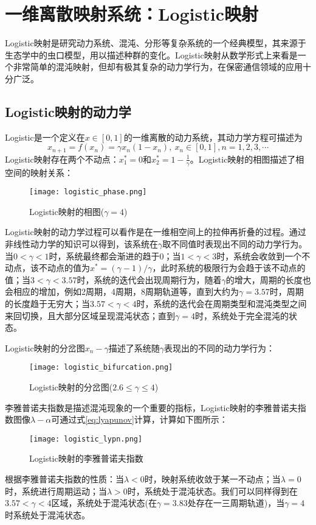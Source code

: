 \section{一维离散映射系统：Logistic映射}

Logistic映射是研究动力系统、混沌、分形等复杂系统的一个经典模型\cite{phatak1995logistic}，其来源于生态学中的虫口模型，用以描述种群的变化。Logistic映射从数学形式上来看是一个非常简单的混沌映射，但却有极其复杂的动力学行为，在保密通信领域的应用十分广泛。

\subsection{Logistic映射的动力学}

Logistic是一个定义在$x\in [0,1]$的一维离散的动力系统，其动力学方程可描述为
\begin{equation}
    x_{n+1}=f(x_n)=\gamma x_n(1-x_n),\ x_n\in [0,1], n=1,2,3,\cdots
\end{equation}
Logistic映射存在两个不动点：$x_1^*=0$和$x_2^*=1-\frac{1}{\gamma}$。Logistic映射的相图描述了相空间的映射关系：
\begin{figure}[!b]
	\centering
	\texttt{[image: logistic\_phase.png]}
    \caption{Logistic映射的相图($\gamma=4$)}
    \label{fig:logi_pha}
\end{figure}

Logistic映射的动力学过程可以看作是在一维相空间上的拉伸再折叠的过程。通过非线性动力学的知识\cite{strogatz2001nonlinear}可以得到，该系统在$\gamma$取不同值时表现出不同的动力学行为。当$0<\gamma<1$时，系统最终都会渐进的趋于0；当$1<\gamma<3$时，系统会收敛到一个不动点，该不动点的值为$x^*=(\gamma-1)/\gamma$，此时系统的极限行为会趋于该不动点的值；当$3<\gamma<3.57$时，系统的迭代会出现周期行为，随着$\gamma$的增大，周期的长度也会相应的增加，例如2周期，4周期，8周期轨道等，直到大约为$\gamma=3.57$时，周期的长度趋于无穷大；当$3.57<\gamma<4$时，系统的迭代会在周期类型和混沌类型之间来回切换，且大部分区域呈现混沌状态；直到$\gamma=4$时，系统处于完全混沌的状态。

Logistic映射的分岔图\cite{strogatz2001nonlinear}$x_n-\gamma$描述了系统随$\gamma$表现出的不同的动力学行为：
\begin{figure}[!]
	\centering
	\texttt{[image: logistic\_bifurcation.png]}
    \caption{Logistic映射的分岔图($2.6\leqslant\gamma\leqslant 4$)}
    \label{fig:logi_pha}
\end{figure}

李雅普诺夫指数是描述混沌现象的一个重要的指标，Logistic映射的李雅普诺夫指数图像$\lambda-\alpha$可通过式\ref{eq:lyapunov}计算，计算如下图所示：
\begin{figure}[!]
	\centering
	\texttt{[image: logistic\_lypn.png]}
    \caption{Logistic映射的李雅普诺夫指数}
    \label{fig:logi_lypn}
\end{figure}
根据李雅普诺夫指数的性质\cite{strogatz2001nonlinear}：当$\lambda<0$时，映射系统收敛于某一不动点；当$\lambda=0$时，系统进行周期运动；当$\lambda>0$时，系统处于混沌状态。我们可以同样得到在$3.57<\gamma<4$区域，系统处于混沌状态(在$\gamma=3.83$处存在一三周期轨道)，当$\gamma=4$时系统处于混沌状态。

